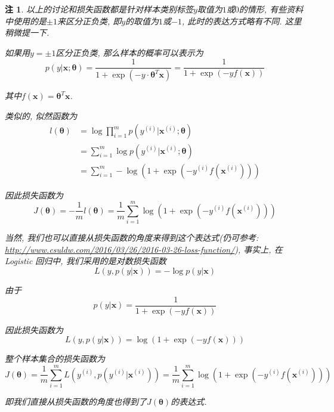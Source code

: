 \documentclass[a4paper,UTF8]{ctexart}
\theoremstyle{plain} \newtheorem{theorem}{定理}[section]
\theoremstyle{plain} \newtheorem{definition}{定义}[section]
\theoremstyle{plain} \newtheorem{lemma}{引理}[section]
\theoremstyle{plain} \newtheorem{proposition}{命题}[section]
\theoremstyle{plain} \newtheorem{example}{例}[section]
\theoremstyle{plain} \newtheorem{remark}{注}[section]
\theoremstyle{plain} \newtheorem{corollary}{推论}[section]
\begin{document}
\begin{remark}
以上的讨论和损失函数都是针对样本类别标签$y$取值为$1$或$0$的情形, 有些资料中使用的是$\pm 1$来区分正负类, 即$y$的取值为$1$或$-1$, 此时的表达方式略有不同. 这里稍微提一下.

如果用$y = \pm 1$区分正负类, 那么样本的概率可以表示为
\begin{equation*}
p(y | \bm{x}; \bm{\theta}) = \frac{1}{1 + \exp (- y \cdot \bm{\theta}^T \bm{x})} = \frac{1}{1 + \exp (- y f(\bm{x}))}
\end{equation*}

其中$f(\bm{x}) = \bm{\theta}^T \bm{x}$.

类似的, 似然函数为
\begin{align*}
l(\bm{\theta}) & = \log \prod_{i=1}^{m} p(y^{(i)}|\bm{x}^{(i)};\bm{\theta}) \\ 
& = \sum_{i=1}^{m} \log p(y^{(i)}|\bm{x}^{(i)};\bm{\theta}) \\ 
& = \sum_{i=1}^{m} - \log (1 + \exp (- y^{(i)} f(\bm{x}^{(i)})))
\end{align*}

因此损失函数为
\begin{equation*}
J(\bm{\theta}) = -\frac{1}{m} l(\bm{\theta}) = \frac{1}{m} \sum_{i=1}^{m} \log (1 + \exp (- y^{(i)} f(\bm{x}^{(i)})))
\end{equation*}

当然, 我们也可以直接从损失函数的角度来得到这个表达式(仍可参考: \url{http://www.csuldw.com/2016/03/26/2016-03-26-loss-function/}), 事实上, 在 Logistic 回归中, 我们采用的是对数损失函数
\begin{equation*}
L(y, p(y | \bm{x})) = - \log p(y | \bm{x})
\end{equation*}

由于
\begin{equation*}
p(y | \bm{x}) = \frac{1}{1 + \exp (- y f(\bm{x}))}
\end{equation*}

因此损失函数为
\begin{equation*}
L(y, p(y | \bm{x})) = \log (1 + \exp (- y f(\bm{x})))
\end{equation*}

整个样本集合的损失函数为
\begin{equation*}
J(\bm{\theta}) = \frac{1}{m} \sum_{i=1}^{m} L(y^{(i)}, p(y^{(i)} | \bm{x}^{(i)})) = \frac{1}{m} \sum_{i=1}^{m} \log (1 + \exp (- y^{(i)} f(\bm{x}^{(i)})))
\end{equation*}

即我们直接从损失函数的角度也得到了$J(\bm{\theta})$的表达式.


\end{remark}
\end{document}
